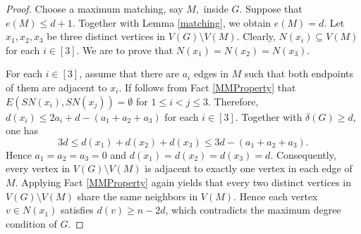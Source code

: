 \documentclass[11pt, a4paper]{article}
\theoremstyle{definition}
\newcommand{\<}{\subseteq}
\begin{document}
\begin{proof}
   Choose a maximum matching, say $M,$ inside $G$. Suppose that $e(M)\leq d+1$. Together with Lemma \ref{matching}, we obtain $e(M)=d$.  Let $x_1,x_2,x_3$ be three distinct vertices in $V(G)\setminus V(M)$. Clearly, $N(x_i)\subseteq V(M)$ for each $i\in [3]$.  We are to prove that $N(x_1)=N(x_2)=N(x_3)$. 

   For each $i\in [3]$, assume that there are $a_i$ edges in $M$ such that both endpoints of them are adjacent to $x_i$. If follows from Fact \ref{MMProperty} that $E(SN(x_i),SN(x_j))=\emptyset$ for $1\leq i<j\leq 3$. %
   Therefore, 
   $d(x_i)\leq 2a_i+d-(a_1+a_2+a_3)$ for each $i\in [3]$. Together with $\delta(G)\geq d$, one has 
   $$
   3d\leq d(x_1)+d(x_2)+d(x_3)\leq 3d-(a_1+a_2+a_3).
   $$
   Hence $a_1=a_2=a_3=0$ and $d(x_1)=d(x_2)=d(x_3)=d$. %
   Consequently, every vertex in $V(G)\setminus V(M)$ is adjacent to exactly one vertex in each edge of $M$. Applying Fact \ref{MMProperty} again yields that every two distinct vertices in $V(G)\setminus V(M)$ share the same neighbors in $V(M)$. Hence each vertex $v\in N(x_1)$ satisfies 
   $
d(v)\geq n-2d
    $, which contradicts the maximum degree  condition of $G$. 
\end{proof}
\end{document}
